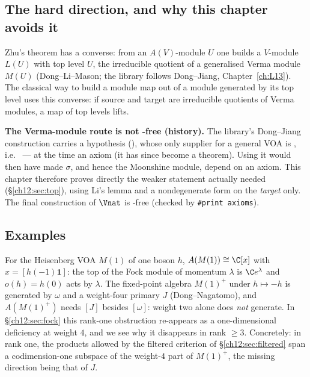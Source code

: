 \subsection{The hard direction, and why this chapter avoids it}\label{ch12:sec:whynotverma}

Zhu's theorem has a converse: from an $A(V)$-module $U$ one builds a $V$-module $L(U)$ with top level
$U$, the irreducible quotient of a generalised Verma module $M(U)$ (Dong--Li--Mason; the library
follows Dong--Jiang, Chapter~\ref{ch:L13}).  The classical way to build a module map out of a module
generated by its top level uses this converse: if source and target are irreducible quotients of Verma
modules, a map of top levels lifts.

\begin{warning}
\textbf{The Verma-module route is not -free (history).}  The library's Dong--Jiang construction
carries a hypothesis  (),
whose only supplier for a general VOA is , i.e.\  --- at the time an
axiom (it has since become a theorem).  Using it would then have made
$\sigma$, and hence the Moonshine module, depend on an axiom.  This chapter therefore proves
directly the weaker statement actually needed (\S\ref{ch12:sec:top}), using Li's lemma and a
nondegenerate form on the \emph{target} only.  The final construction of $\Vnat$ is -free
(checked by \texttt{\#print axioms}).
\end{warning}

\subsection{Examples}

\begin{example}\label{ch12:ex:heis}
For the Heisenberg VOA $M(1)$ of one boson $h$, $A(M(1))\cong\C[x]$ with $x=[h(-1)\mathbf 1]$: the top
of the Fock module of momentum $\lambda$ is $\C e^\lambda$ and $o(h)=h(0)$ acts by $\lambda$.  The
fixed-point algebra $M(1)^+$ under $h\mapsto-h$ is generated by $\omega$ and a weight-four primary $J$
(Dong--Nagatomo), and $A(M(1)^+)$ needs $[J]$ besides $[\omega]$: weight two alone does \emph{not}
generate.  In \S\ref{ch12:sec:fock} this rank-one obstruction re-appears as a one-dimensional
deficiency at weight $4$, and we see why it disappears in rank $\ge3$.
  Concretely: in rank one, the products allowed by the filtered criterion of
\S\ref{ch12:sec:filtered} span a codimension-one subspace of the weight-$4$ part of $M(1)^+$, the missing
direction being that of $J$.
\end{example}

